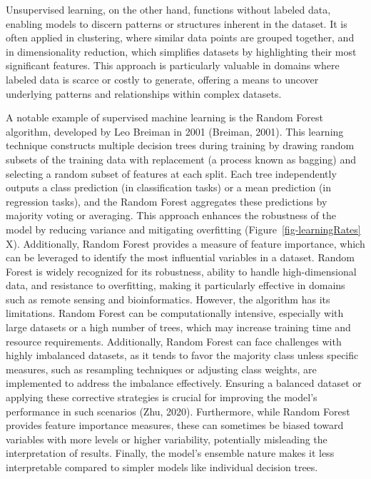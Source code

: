 \documentclass[
  letterpaper,
  11pt,
  english,
  singlespacing,
  headsepline]{MastersDoctoralThesis}
\begin{document}
\begin{spacing}{1.5}
Unsupervised learning, on the other hand, functions without labeled
data, enabling models to discern patterns or structures inherent in the
dataset. It is often applied in clustering, where similar data points
are grouped together, and in dimensionality reduction, which simplifies
datasets by highlighting their most significant features. This approach
is particularly valuable in domains where labeled data is scarce or
costly to generate, offering a means to uncover underlying patterns and
relationships within complex datasets.

A notable example of supervised machine learning is the Random Forest
algorithm, developed by Leo Breiman in 2001 (Breiman, 2001). This
learning technique constructs multiple decision trees during training by
drawing random subsets of the training data with replacement (a process
known as bagging) and selecting a random subset of features at each
split. Each tree independently outputs a class prediction (in
classification tasks) or a mean prediction (in regression tasks), and
the Random Forest aggregates these predictions by majority voting or
averaging. This approach enhances the robustness of the model by
reducing variance and mitigating overfitting
(Figure~\ref{fig-learningRates} X). Additionally, Random Forest provides
a measure of feature importance, which can be leveraged to identify the
most influential variables in a dataset. Random Forest is widely
recognized for its robustness, ability to handle high-dimensional data,
and resistance to overfitting, making it particularly effective in
domains such as remote sensing and bioinformatics. However, the
algorithm has its limitations. Random Forest can be computationally
intensive, especially with large datasets or a high number of trees,
which may increase training time and resource requirements.
Additionally, Random Forest can face challenges with highly imbalanced
datasets, as it tends to favor the majority class unless specific
measures, such as resampling techniques or adjusting class weights, are
implemented to address the imbalance effectively. Ensuring a balanced
dataset or applying these corrective strategies is crucial for improving
the model's performance in such scenarios (Zhu, 2020). Furthermore,
while Random Forest provides feature importance measures, these can
sometimes be biased toward variables with more levels or higher
variability, potentially misleading the interpretation of results.
Finally, the model's ensemble nature makes it less interpretable
compared to simpler models like individual decision trees.


\end{spacing}
\end{document}
